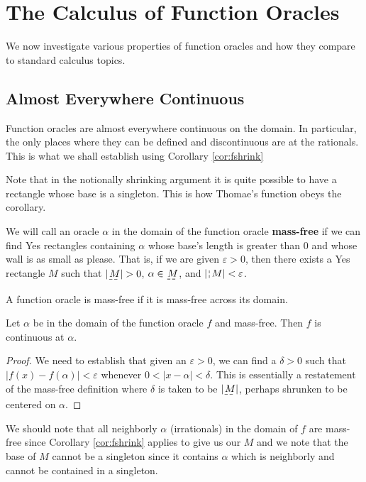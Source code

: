 \documentclass[12pt]{article}
\begin{document}
\section{The Calculus of Function Oracles}

We now investigate various properties of function oracles and how they compare to standard calculus topics. 

\subsection{Almost Everywhere Continuous}

Function oracles are almost everywhere continuous on the domain. In particular, the only places where they can be defined and discontinuous are at the rationals. This is what we shall establish using Corollary \ref{cor:fshrink}

Note that in the notionally shrinking argument it is quite possible to have a rectangle whose base is a singleton. This is how Thomae's function obeys the corollary. 

We will call an oracle $\alpha$ in the domain of the function oracle \textbf{mass-free} if we can find Yes rectangles containing $\alpha$ whose base's length is greater than 0 and whose wall is as small as please. That is, if we are given $\varepsilon > 0$, then there exists a Yes rectangle $M$ such that $|\base{M}| > 0$, $\alpha \in \base{M}$, and $|\wall{M}| < \varepsilon$.
 
 A function oracle is mass-free if it is mass-free across its domain.  

\begin{proposition}
Let $\alpha$ be in the domain of the function oracle $f$ and mass-free. Then $f$ is continuous at $\alpha$.
\end{proposition}

\begin{proof}
    We need to establish that given an $\varepsilon > 0$, we can find a $\delta > 0$ such that $|f(x) - f(\alpha)| < \varepsilon$ whenever $0 < |x - \alpha| < \delta$. This is essentially a restatement of the mass-free definition where $\delta$ is taken to be $|\base{M}|$, perhaps shrunken to be centered on $\alpha$. 
\end{proof}

We should note that all neighborly $\alpha$ (irrationals) in the domain of $f$ are mass-free since Corollary \ref{cor:fshrink} applies to give us our $M$ and we note that the base of $M$ cannot be a singleton since it contains $\alpha$ which is neighborly and cannot be contained in a singleton.
\end{document}
